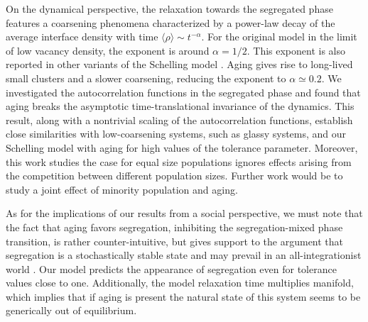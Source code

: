 On the dynamical perspective, the relaxation towards the segregated phase features a coarsening phenomena characterized by a power-law decay of the average interface density with time $\langle \rho \rangle \sim t^{-\alpha}$. For the original model in the limit of low vacancy density, the exponent is around $\alpha = 1/2$. This exponent is also reported in other variants of the Schelling model \cite{Dall_Asta_2008,Interfacial_roughening}. Aging gives rise to long-lived small clusters and a slower coarsening, reducing the exponent to $\alpha \simeq 0.2$. We investigated the autocorrelation functions in the segregated phase and found that aging breaks the asymptotic time-translational invariance of the dynamics. This result, along with a nontrivial scaling of the autocorrelation functions, establish close similarities with low-coarsening systems, such as glassy systems, and our Schelling model with aging for high values of the tolerance parameter. Moreover, this work studies the case for equal size populations ignores effects arising from the competition between different population sizes. Further work would be to study a joint effect of minority population and aging.

As for the implications of our results from a social perspective, we must note that the fact that aging favors segregation, inhibiting the segregation-mixed phase transition, is rather counter-intuitive, but gives support to the argument that segregation is a stochastically stable state and may prevail in an all-integrationist world \cite{Zhang}. Our model predicts the appearance of segregation even for tolerance  values close to one. Additionally, the model relaxation time multiplies manifold, which implies that if aging is present the natural state of this system seems to be generically out of equilibrium.   